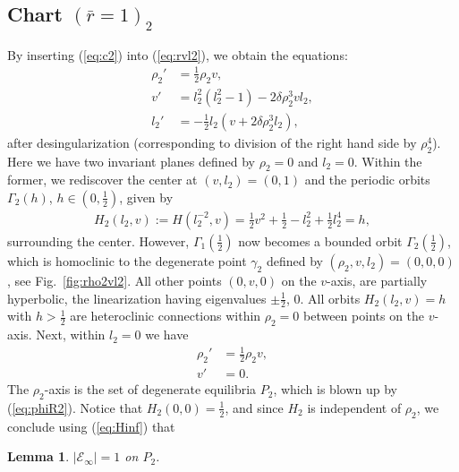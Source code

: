 \documentclass[reqno,12pt]{amsart}
\newcommand{\eqlab}[1]{\label{eq:#1}}
\renewcommand{\eqref}[1]{(\ref{eq:#1})}
\newcommand{\figref}[1]{Fig.~\ref{fig:#1}}
\newcommand{\lemmalab}[1]{\label{lemma:#1}}
\newtheorem{lemma}[theorem]{Lemma}
\numberwithin{equation}{section}
\begin{document}
\subsection{Chart $(\bar r=1)_2$}
By inserting \eqref{c2} into \eqref{rvl2}, we obtain the equations:
\begin{equation}\eqlab{eqnsrho2vl2}
\begin{aligned}
  \rho_2' &= \frac12 \rho_2 v,\\
 v' &=l_2^2(l_2^2-1)-2\delta \rho_2^3 v l_2,\\
 l_2' &=-\frac12 l_2 \left(v+2\delta \rho_2^3 l_2\right),
\end{aligned}
\end{equation}
after desingularization (corresponding to division of the right hand side by $\rho_2^4$).
Here we have two invariant planes defined by $\rho_2=0$ and $l_2=0$.
Within the former, we rediscover the center at $(v,l_2)=(0,1)$ and the periodic orbits $\Gamma_2(h)$, $h\in \left(0,\frac12\right)$, given by 
\begin{align}\eqlab{H2}
 H_2(l_2,v):=H(l_2^{-2},v) =  \frac12 v^2 +\frac12 -l_2^2+\frac12 l_2^4=h,
\end{align}
surrounding the center.
However, $\Gamma_1\!\left(\frac12\right)$ now becomes a bounded orbit $\Gamma_2\!\left(\frac12\right)$, which is homoclinic to the degenerate point $\gamma_2$ defined by $(\rho_2,v,l_2)=(0,0,0)$, see \figref{rho2vl2}. All other points $(0,v,0)$ on the $v$-axis, are partially hyperbolic, the linearization having eigenvalues $\pm \frac12$, $0$. All orbits $H_2(l_2,v)=h$ with $h>\frac12$ are heteroclinic connections within $\rho_2=0$ between points on the $v$-axis. Next, within $l_2=0$ we have 
\begin{align*}
 \rho_2' &= \frac12 \rho_2 v,\\
  v' &=0.
\end{align*}
The $\rho_2$-axis is the set of degenerate equilibria $P_2$, which is blown up by \eqref{phiR2}. Notice that $H_2(0,0)=\frac12 $, and since $H_2$ is independent of $\rho_2$, we conclude using \eqref{Hinf} that 
\begin{lemma}\lemmalab{EinfEq1onP2}
$\vert \mathcal E_\infty\vert=1$ on $P_2$.  
\end{lemma}
\end{document}
